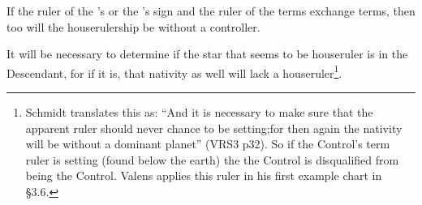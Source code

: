 If the ruler of the \Sun’s or the \Moon’s sign and the ruler of the terms exchange terms, then too will the houserulership be without a controller. 

It will be necessary to determine if the star that seems to be houseruler is in the Descendant, for if it is, that nativity as well will lack a houseruler\footnote{Schmidt translates this as: ``And it is necessary to make sure that the apparent ruler should never chance to be setting;for then again the nativity will be without a dominant planet'' (VRS3 p32). So if the Control's term ruler is setting (found below the earth) the the Control is disqualified from being the Control. Valens applies this ruler in his first example chart in \S{3.6}.}.

\newpage

\vspace{1em}
